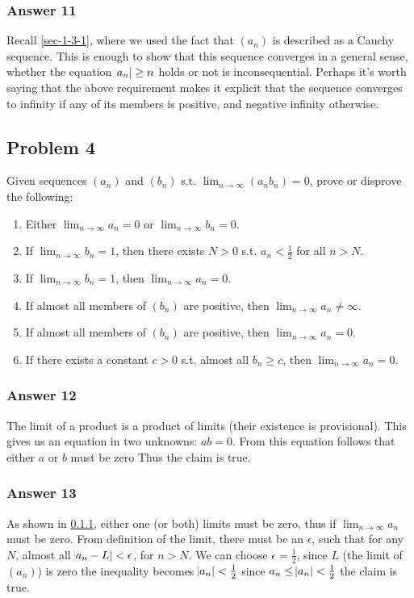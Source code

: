 \documentclass[11pt]{article}
\begin{document}
\subsubsection{Answer 11}
\label{sec-1-3-3}
Recall \ref{sec-1-3-1}, where we used the fact that $(a_n)$ is described as a
Cauchy sequence.  This is enough to show that this sequence converges in
a general sense, whether the equation $\abs{a_n} \geq n$ holds or not
is inconsequential.  Perhaps it's worth saying that the above requirement
makes it explicit that the sequence converges to infinity if any of its
members is positive, and negative infinity otherwise.
\subsection{Problem 4}
\label{sec-1-4}
Given sequences $(a_n)$ and $(b_n)$ s.t. $\lim_{n \to \infty}(a_nb_n) = 0$,
prove or disprove the following:

\begin{enumerate}
\item Either $\lim_{n \to \infty}a_n = 0$ or $\lim_{n \to \infty}b_n = 0$.
\item If $\lim_{n \to \infty}b_n = 1$, then there exists $N > 0$ s.t.
      $a_n < \frac{1}{2}$ for all $n > N$.
\item If $\lim_{n \to \infty}b_n = 1$, then $\lim_{n \to \infty}a_n = 0$.
\item If almost all members of $(b_n)$ are positive, then 
      $\lim_{n \to \infty}a_n \neq \infty$.
\item If almost all members of $(b_n)$ are positive, then 
      $\lim_{n \to \infty}a_n = 0$.
\item If there exists a constant $c > 0$ s.t. almost all $b_n \geq c$, then
      $\lim_{n \to \infty}a_n = 0$.
\end{enumerate}

\subsubsection{Answer 12}
\label{sec-1-4-1}
The limit of a product is a product of limits (their existence is
provisional).  This gives us an equation in two unknowns: $ab = 0$.
From this equation follows that either $a$ or $b$ must be zero
Thus the claim is true.
\subsubsection{Answer 13}
\label{sec-1-4-2}
As shown in \ref{sec-1-4-1}, either one (or both) limits must be zero,
thus if $\lim_{n \to \infty}a_n$ must be zero.  From definition of
the limit, there must be an $\epsilon$, such that for any $N$, almost
all $\abs{a_n - L} < \epsilon$, for $n > N$.  We can choose
$\epsilon = \frac{1}{2}$, since $L$ (the limit of $(a_n)$) is zero
the inequality becomes $\abs{a_n} < \frac{1}{2}$ since
$a_n \leq \abs{a_n} < \frac{1}{2}$ the claim is true.
\end{document}
